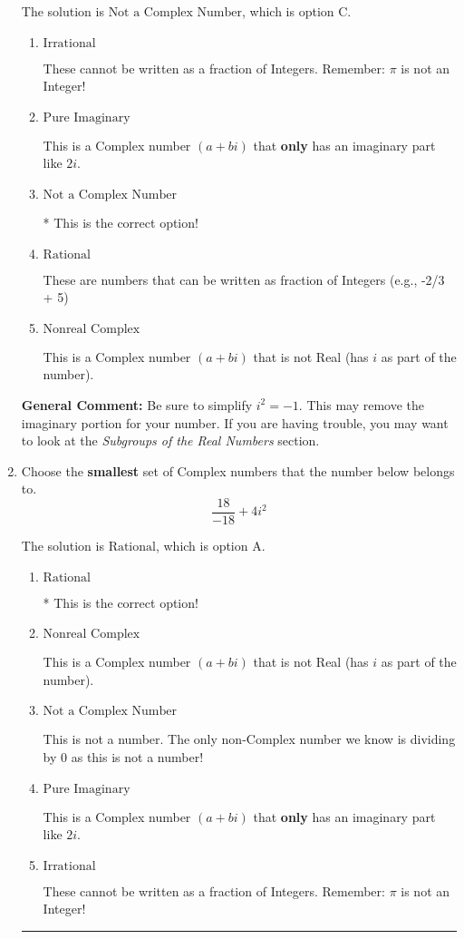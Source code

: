 \documentclass{extbook}[14pt]
\newcommand{\litem}[1]{\item #1

\rule{\textwidth}{0.4pt}}
\begin{document}
\begin{enumerate}
{The solution is \( \text{Not a Complex Number} \), which is option C.\begin{enumerate}[label=\Alph*.]
\item \( \text{Irrational} \)

These cannot be written as a fraction of Integers. Remember: $\pi$ is not an Integer!
\item \( \text{Pure Imaginary} \)

This is a Complex number $(a+bi)$ that \textbf{only} has an imaginary part like $2i$.
\item \( \text{Not a Complex Number} \)

* This is the correct option!
\item \( \text{Rational} \)

These are numbers that can be written as fraction of Integers (e.g., -2/3 + 5)
\item \( \text{Nonreal Complex} \)

This is a Complex number $(a+bi)$ that is not Real (has $i$ as part of the number).
\end{enumerate}

\textbf{General Comment:} Be sure to simplify $i^2 = -1$. This may remove the imaginary portion for your number. If you are having trouble, you may want to look at the \textit{Subgroups of the Real Numbers} section.
}
\litem{
Choose the \textbf{smallest} set of Complex numbers that the number below belongs to.
\[ \frac{18}{-18}+4i^2 \]

The solution is \( \text{Rational} \), which is option A.\begin{enumerate}[label=\Alph*.]
\item \( \text{Rational} \)

* This is the correct option!
\item \( \text{Nonreal Complex} \)

This is a Complex number $(a+bi)$ that is not Real (has $i$ as part of the number).
\item \( \text{Not a Complex Number} \)

This is not a number. The only non-Complex number we know is dividing by 0 as this is not a number!
\item \( \text{Pure Imaginary} \)

This is a Complex number $(a+bi)$ that \textbf{only} has an imaginary part like $2i$.
\item \( \text{Irrational} \)

These cannot be written as a fraction of Integers. Remember: $\pi$ is not an Integer!
\end{enumerate}

}
\end{enumerate}
\end{document}
